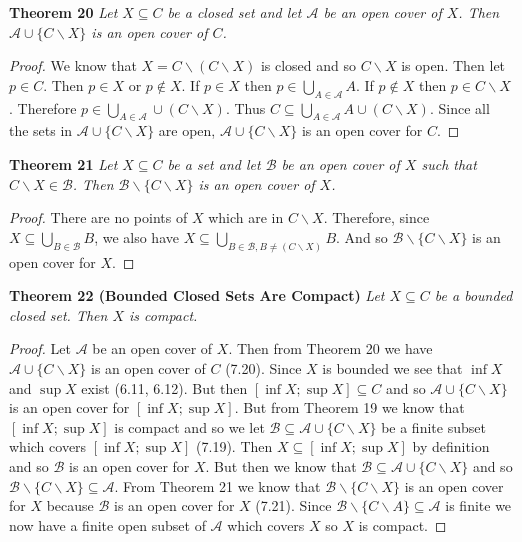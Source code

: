 \documentclass{article}
\begin{document}
\begin{flushleft}
\textbf{Theorem 20}
\textsl{Let $X \subseteq C$ be a closed set and let $\mathcal{A}$ be an open cover of $X$. Then $\mathcal{A} \cup \{C \backslash X\}$ is an open cover of $C$.}
\begin{proof}
We know that $X=C \backslash (C \backslash X)$ is closed and so $C \backslash X$ is open. Then let $p \in C$. Then $p \in X$ or $p \notin X$. If $p \in X$ then $p \in \bigcup_{A \in \mathcal{A}} A$. If $p \notin X$ then $p \in C \backslash X$. Therefore $p \in \bigcup_{A \in \mathcal{A}} \cup \left( C \backslash X \right)$. Thus $C \subseteq \bigcup_{A \in \mathcal{A}} A \cup \left(C \backslash X \right)$. Since all the sets in $\mathcal{A} \cup \{C \backslash X\}$ are open, $\mathcal{A} \cup \{C \backslash X\}$ is an open cover for $C$.
\end{proof}

\textbf{Theorem 21}
\textsl{Let $X \subseteq C$ be a set and let $\mathcal{B}$ be an open cover of $X$ such that $C \backslash X \in \mathcal{B}$. Then $\mathcal{B} \backslash \{C \backslash X\}$ is an open cover of $X$.}
\begin{proof}
There are no points of $X$ which are in $C \backslash X$. Therefore, since $X \subseteq \bigcup_{B \in \mathcal{B}} B$, we also have $X \subseteq \bigcup_{B \in \mathcal{B}, B \neq (C \backslash X)} B$. And so $\mathcal{B} \backslash \{C \backslash X\}$ is an open cover for $X$.
\end{proof}

\textbf{Theorem 22 (Bounded Closed Sets Are Compact)}
\textsl{Let $X \subseteq C$ be a bounded closed set. Then $X$ is compact.}
\begin{proof}
Let $\mathcal{A}$ be an open cover of $X$. Then from Theorem 20 we have $\mathcal{A} \cup \{C \backslash X\}$ is an open cover of $C$ (7.20). Since $X$ is bounded we see that $\inf X$ and $\sup X$ exist (6.11, 6.12). But then $[\inf X ; \sup X] \subseteq C$ and so $\mathcal{A} \cup \{C \backslash X\}$ is an open cover for $[\inf X ; \sup X]$. But from Theorem 19 we know that $[\inf X ; \sup X]$ is compact and so we let $\mathcal{B} \subseteq \mathcal{A} \cup \{C \backslash X\}$ be a finite subset which covers $[\inf X ; \sup X]$ (7.19). Then $X \subseteq [\inf X ; \sup X]$ by definition and so $\mathcal{B}$ is an open cover for $X$. But then we know that $\mathcal{B} \subseteq \mathcal{A} \cup \{C \backslash X\}$ and so $\mathcal{B} \backslash \{C \backslash X\} \subseteq \mathcal{A}$. From Theorem 21 we know that $\mathcal{B} \backslash \{C \backslash X\}$ is an open cover for $X$ because $\mathcal{B}$ is an open cover for $X$ (7.21). Since $\mathcal{B} \backslash \{C \backslash A\} \subseteq \mathcal{A}$ is finite we now have a finite open subset of $\mathcal{A}$ which covers $X$ so $X$ is compact.
\end{proof}

\end{flushleft}
\end{document}
